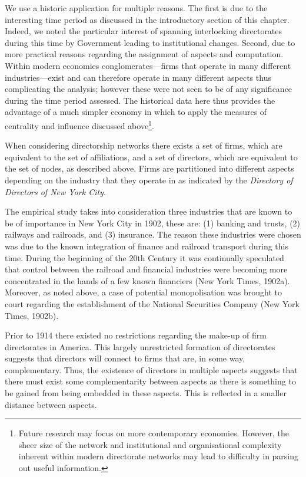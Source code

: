 We use a historic application for multiple reasons. The first is due to the interesting time period as discussed in the introductory section of this chapter. Indeed, we noted the particular interest of spanning interlocking directorates during this time by Government leading to institutional changes. Second, due to more practical reasons regarding the assignment of aspects and computation. Within modern economies conglomerates---firms that operate in many different industries---exist and can therefore operate in many different aspects thus complicating the analysis; however these were not seen to be of any significance during the time period assessed. The historical data here thus provides the advantage of a much simpler economy in which to apply the measures of centrality and influence discussed above\footnote{Future research may focus on more contemporary economies. However, the sheer size of the network and institutional and organisational complexity inherent within modern directorate networks may lead to difficulty in parsing out useful information.}.

When considering directorship networks there exists a set of firms, which are equivalent to the set of affiliations, and a set of directors, which are equivalent to the set of nodes, as described above. Firms are partitioned into different aspects depending on the industry that they operate in as indicated by the \emph{Directory of Directors of New York City}.

The empirical study takes into consideration three industries that are known to be of importance in New York City in 1902, these are: (1) banking and trusts, (2) railways and railroads, and (3) insurance. The reason these industries were chosen was due to the known integration of finance and railroad transport during this time. During the beginning of the 20th Century it was continually speculated that control between the railroad and financial industries were becoming more concentrated in the hands of a few known financiers (New York Times, 1902a). Moreover, as noted above, a case of potential monopolisation was brought to court regarding the establishment of the National Securities Company (New York Times, 1902b).

Prior to 1914 there existed no restrictions regarding the make-up of firm directorates in America. This largely unrestricted formation of directorates suggests that directors will connect to firms that are, in some way, complementary. Thus, the existence of directors in multiple aspects suggests that there must exist some complementarity between aspects as there is something to be gained from being embedded in these aspects. This is reflected in a smaller distance between aspects.

